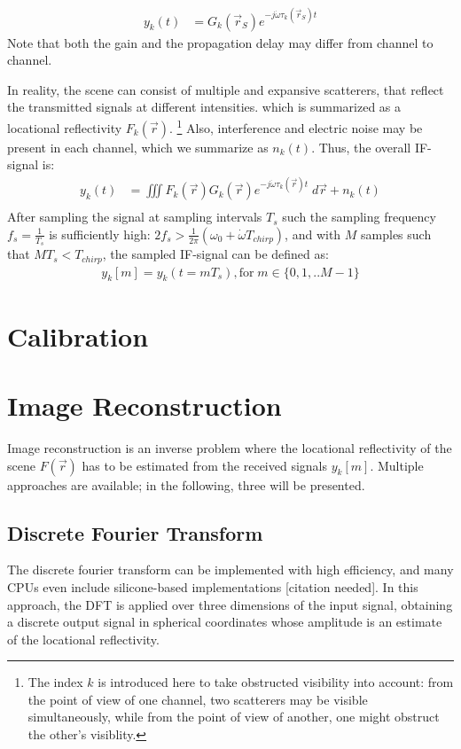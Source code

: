 \begin{align}
    y_k(t) & = G_k(\vec r_S)e^{-j\dot\omega\tau_k(\vec r_S)t} \label{eqn:ideal_scatterer}
\end{align}
Note that both the gain and the propagation delay may differ from channel to channel.

In reality, the scene can consist of multiple and expansive scatterers,
that reflect the transmitted signals at different intensities.
which is summarized as a locational reflectivity $F_k(\vec r)$.
\footnote{
    The index $k$ is introduced here to take obstructed visibility into account:
    from the point of view of one channel, two scatterers may be visible simultaneously,
    while from the point of view of another, one might obstruct the other's visiblity.
}
Also, interference and electric noise may be present in each channel,
which we summarize as $n_k(t)$.
Thus, the overall IF-signal is:
\begin{align}
    y_k(t) & = \iiint F_k(\vec r)G_k(\vec r) e^{-j\dot\omega\tau_k(\vec r)t} \;d\vec r + n_k(t) \\
\end{align}
After sampling the signal at sampling intervals $T_s$ such the sampling frequency $f_s = \frac{1}{T_s}$
is sufficiently high: ${2f_s > \frac{1}{2\pi}(\omega_0 + \dot \omega T_{chirp})}$, and with $M$ samples such that $MT_s < T_{chirp}$,
the sampled IF-signal can be defined as:
\begin{align}
    y_k[m] = y_k(t=mT_s), \text{for}\;m \in \{0,1,..M-1\}
\end{align}


\section{Calibration}

\section{Image Reconstruction}
Image reconstruction is an inverse problem where the locational reflectivity of the scene $F(\vec r)$
has to be estimated from the received signals $y_k[m]$.
Multiple approaches are available; in the following, three will be presented.

\subsection{Discrete Fourier Transform}
\label{ssec:dft_imaging_theory}
The discrete fourier transform can be implemented with high efficiency,
and many CPUs even include silicone-based implementations [citation needed].
In this approach, the DFT is applied over three dimensions of the input signal,
obtaining a discrete output signal in spherical coordinates whose amplitude is an estimate of the locational reflectivity.

